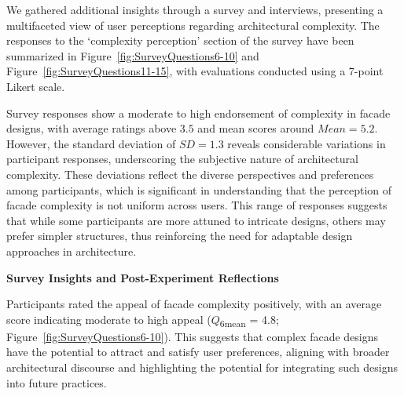 %    


We gathered additional insights through a survey and interviews, presenting a multifaceted view of user perceptions regarding architectural complexity.
The responses to the `complexity perception' section of the survey have been summarized in Figure~\ref{fig:SurveyQuestions6-10} and Figure~\ref{fig:SurveyQuestions11-15}, with evaluations conducted using a 7-point Likert scale.

Survey responses show a moderate to high endorsement of complexity in facade designs, with average ratings above \(3.5\) and mean scores around \(Mean = 5.2\).
However, the standard deviation of \(SD = 1.3\) reveals considerable variations in participant responses, underscoring the subjective nature of architectural complexity.
These deviations reflect the diverse perspectives and preferences among participants, which is significant in understanding that the perception of facade complexity is not uniform across users.
This range of responses suggests that while some participants are more attuned to intricate designs, others may prefer simpler structures, thus reinforcing the need for adaptable design approaches in architecture.

\textbf{Survey Insights and Post-Experiment Reflections}


Participants rated the appeal of facade complexity positively, with an average score indicating moderate to high appeal (\(Q\)\textsubscript{\small{6mean}} = 4.8; Figure~\ref{fig:SurveyQuestions6-10}).
This suggests that complex facade designs have the potential to attract and satisfy user preferences, aligning with broader architectural discourse and highlighting the potential for integrating such designs into future practices.

